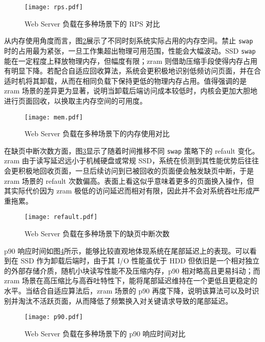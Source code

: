 \begin{figure}[htbp]
    \centering
    \texttt{[image: rps.pdf]}
    \caption{Web Server 负载在多种场景下的 RPS 对比}
    \label{fig:rps}
\end{figure}

从内存使用角度而言，图\ref{fig:mem}展示了不同时刻系统实际占用的内存空间。禁止 \texttt{swap} 时的占用最为紧张，一旦工作集超出物理可用范围，性能会大幅波动。SSD \texttt{swap} 能在一定程度上释放物理内存，但幅度有限；zram 则借助压缩手段使得内存占用有明显下降。若配合自适应回收算法，系统会更积极地识别低频访问页面，并在合适时机将其卸载，从而在相同负载下保持更低的物理内存占用。值得强调的是 zram 场景的差异更为显著，说明当卸载后端访问成本较低时，内核会更加大胆地进行页面回收，以换取主内存空间的可用度。

\begin{figure}[htbp]
    \centering
    \texttt{[image: mem.pdf]}
    \caption{Web Server 负载在多种场景下的内存使用对比}
    \label{fig:mem}
\end{figure}

在缺页中断次数方面，图\ref{fig:refault}显示了随着时间推移不同 \texttt{swap} 策略下的 refault 变化。zram 由于读写延迟远小于机械硬盘或常规 SSD，系统在侦测到其性能优势后往往会更积极地回收页面，一旦后续访问到已被回收的页面便会触发缺页中断，于是 zram 场景的 refault 次数偏高。表面上看这似乎意味着更多的页面换入操作，但其实际代价因为 zram 极低的访问延迟而相对有限，因此并不会对系统吞吐形成严重拖累。

\begin{figure}[htbp]
    \centering
    \texttt{[image: refault.pdf]}
    \caption{Web Server 负载在多种场景下的缺页中断次数}
    \label{fig:refault}
\end{figure}

p90 响应时间如图\ref{fig:p90}所示，能够比较直观地体现系统在尾部延迟上的表现。可以看到在 SSD 作为卸载后端时，由于其 I/O 性能虽优于 HDD 但依旧是一个相对独立的外部存储介质，随机小块读写性能不及压缩内存，p90 相对略高且更易抖动；而 zram 场景在高压缩比与高吞吐特性下，能将尾部延迟维持在一个更低且更稳定的水平。当结合自适应算法后，zram 场景的 p90 再度下降，说明该算法可以及时识别并淘汰不活跃页面，从而降低了频繁换入对关键请求导致的尾部延迟。

\begin{figure}[htbp]
    \centering
    \texttt{[image: p90.pdf]}
    \caption{Web Server 负载在多种场景下的 p90 响应时间对比}
    \label{fig:p90}
\end{figure}

